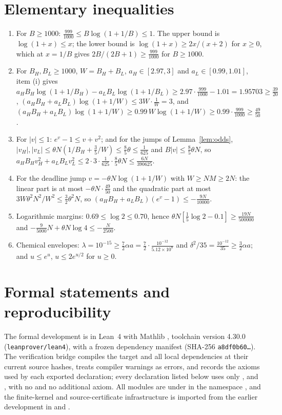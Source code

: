 \documentclass[11pt,a4paper]{article}
\theoremstyle{plain}
\theoremstyle{definition}
\theoremstyle{remark}
\begin{document}
\section{Elementary inequalities}\label{app:ineq}
\begin{enumerate}[label=(\roman*)]
\item For $B\geq1000$: $\frac{999}{1000}\leq B\log(1+1/B)\leq1$. The upper bound is $\log(1+x)\leq x$; the lower bound is $\log(1+x)\geq2x/(x+2)$ for $x\geq0$, which at $x=1/B$ gives $2B/(2B+1)\geq\frac{999}{1000}$ for $B\geq1000$.
\item For $B_H,B_L\geq1000$, $W=B_H+B_L$, $a_H\in[2.97,3]$ and $a_L\in[0.99,1.01]$, item (i) gives $a_HB_H\log(1+1/B_H)-a_LB_L\log(1+1/B_L)\geq2.97\cdot\frac{999}{1000}-1.01=1.95703\geq\frac{39}{20}$, $(a_HB_H+a_LB_L)\log(1+1/W)\leq3W\cdot\frac1W=3$, and $(a_HB_H+a_LB_L)\log(1+1/W)\geq0.99\,W\log(1+1/W)\geq0.99\cdot\frac{999}{1000}\geq\frac{49}{50}$.
\item For $|v|\leq1$: $e^{v}-1\leq v+v^2$; and for the jumps of Lemma~\ref{lem:odds}, $|v_H|,|v_L|\leq\theta N(1/B_H+\frac35/W)\leq\frac{8}{5}\theta\leq\frac1{625}$ and $B|v|\leq\frac{8}{5}\theta N$, so $a_HB_Hv_H^2+a_LB_Lv_L^2\leq2\cdot3\cdot\frac{1}{625}\cdot\frac{8}{5}\theta N\leq\frac{6N}{390625}$.
\item For the deadline jump $v=-\theta N\log(1+1/W)$ with $W\geq NM\geq2N$: the linear part is at most $-\theta N\cdot\frac{49}{50}$ and the quadratic part at most $3W\theta^2N^2/W^2\leq\frac32\theta^2N$, so $(a_HB_H+a_LB_L)(e^{v}-1)\leq-\frac{9N}{10000}$.
\item Logarithmic margins: $0.69\leq\log2\leq0.70$, hence $\theta N[\frac15\log2-0.1]\geq\frac{19N}{500000}$ and $-\frac{9}{5000}N+\theta N\log4\leq-\frac N{2500}$.
\item Chemical envelopes: $\lambda=10^{-15}\geq\frac72\alpha a=\frac72\cdot\frac{10^{-12}}{5.12\times10^{8}}$ and $\delta^2/35=\frac{10^{-12}}{35}\geq\frac32\alpha a$; and $u\leq e^{u}$, $u\leq2e^{u/2}$ for $u\geq0$.
\end{enumerate}

\section{Formal statements and reproducibility}\label{app:formal}
The formal development is in Lean~4 \citep{demoura2021} with Mathlib \citep{mathlib2020}, toolchain version 4.30.0 (\texttt{leanprover/lean4}), with a frozen dependency manifest (SHA-256 \texttt{a8df0b60\ldots}). The verification bridge compiles the target and all local dependencies at their current source hashes, treats compiler warnings as errors, and records the axioms used by each exported declaration; every declaration listed below uses only ,  and , with no  and no additional axiom. All modules are under  in the namespace , and the finite-kernel and source-certificate infrastructure is imported from the earlier development in  and .
\end{document}
